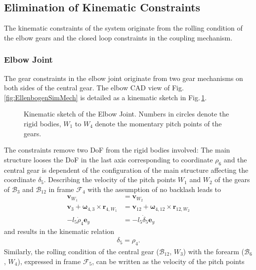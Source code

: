 \documentclass[letterpaper, 10 pt, conference]{ieeeconf}  %
\newcommand{\body}[1]{\mathcal{B}_{#1}}
\newcommand{\ks}[1]{\mathcal{F}_{#1}}
\begin{document}
\subsection{Elimination of Kinematic Constraints}

The kinematic constraints of the system originate from the rolling condition of the elbow gears and the closed loop constraints in the coupling mechanism.

\subsubsection{Elbow Joint}

The gear constraints in the elbow joint originate from two gear mechanisms on both sides of the central gear.
The elbow CAD view of Fig.\,\ref{fig:EllenbogenSimMech} is detailed as a kinematic sketch in Fig.\,\ref{fig:KAS5_elbow}.
%
\begin{figure}[htb]
    \small
    \begin{minipage}[t]{7.5cm}
        \vspace{0.2cm} %
        
    \end{minipage}
    
    \caption{Kinematic sketch of the Elbow Joint. Numbers in circles denote the rigid bodies, $W_1$ to $W_4$ denote the momentary pitch points of the gears.}
    \label{fig:KAS5_elbow}
\end{figure}
%
The constraints remove two DoF from the rigid bodies involved:
The main structure looses the DoF in the last axis corresponding to coordinate $\rho_6$ and the central gear is dependent of the configuration of the main structure affecting the coordinate $\delta_5$.
%
Describing the velocity of the pitch points $W_1$ and $W_2$ of the gears of $\body{3}$ and $\body{12}$ in frame $\ks{4}$ with the assumption of no backlash leads to
%
\begin{align}
\bm{v}_{W_1} &= \bm{v}_{W_2} \\
\bm{v}_{3} +\bm{\omega}_{4,3} \times \bm{r}_{4,W_1} &= \bm{v}_{12} +\bm{\omega}_{4,12} \times \bm{r}_{12,W_2} \\
-l_{5}\dot{\rho}_4\bm{e}_y &= -l_{5}\dot{\delta}_5\bm{e}_y
\end{align}
%
and results in the kinematic relation
%
\begin{align}
\delta_5 = \rho_4.
\label{equ:delta5_explicit}
\end{align}
%
Similarly, the rolling condition of the central gear ($\body{12}$, $W_3$) with the forearm ($\body{6}$, $W_4$), expressed in frame $\ks{5}$, can be written as the velocity of the pitch points
\end{document}
